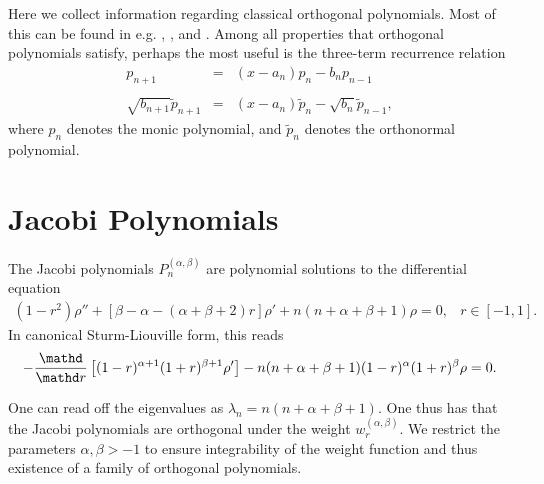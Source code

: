\label{app:polynomials}Here we collect information regarding classical
orthogonal polynomials. Most of this can be found in e.g. {\cite{szego1975}},
{\cite{abramowitz1972}}, and {\cite{gautschi2004}}. Among all properties that
orthogonal polynomials satisfy, perhaps the most useful is the three-term
recurrence relation
\begin{eqnarray}
  p_{n + 1} & = & (x - a_n) p_n - b_n p_{n - 1}  \label{eq:opoly3term-monic}\\
  &  &  \nonumber\\
  \sqrt{b_{n + 1}} \tilde{p}_{n + 1} & = & (x - a_n) \tilde{p}_n - \sqrt{b_n} 
  \tilde{p}_{n - 1},  \label{eq:opoly3term-normal}
\end{eqnarray}
where $p_n$ denotes the monic polynomial, and $\tilde{p}_n$ denotes the
orthonormal polynomial.

\section{Jacobi Polynomials}

\label{app:polynomials-jacobi}The Jacobi polynomials $P_n^{(\alpha, \beta)}$
are polynomial solutions to the differential equation
\begin{equation}
  \label{eq:jacobi-differential-equation} \begin{array}{ll}
    (1 - r^2) \rho'' + \left[ \beta - \alpha - (\alpha + \beta + 2) r \right]
    \rho' + n (n + \alpha + \beta + 1) \rho = 0, & r \in [- 1, 1] .
  \end{array}
\end{equation}
In canonical Sturm-Liouville form, this reads
\begin{equation}
  \label{eq:slp-jacobi-canonical} - \frac{\mathd}{\mathd r}  \left[ (1 -
  r)^{\alpha + 1} (1 + r)^{\beta + 1} \rho' \right] - n (n + \alpha + \beta +
  1) (1 - r)^{\alpha} (1 + r)^{\beta} \rho = 0.
\end{equation}

One can read off the eigenvalues as $\lambda_n = n (n + \alpha +
\beta + 1)$.  One thus has that the Jacobi polynomials are orthogonal
under the weight $w_r^{(\alpha, \beta)}$. We restrict the parameters
$\alpha,\beta>-1$ to ensure integrability of the weight function and
thus existence of a family of orthogonal polynomials.


